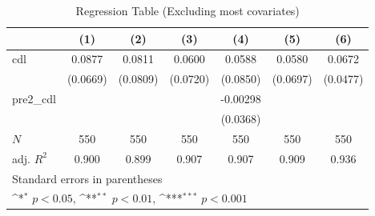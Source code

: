 \begin{table}[htbp]\centering
\def\sym#1{\ifmmode^{#1}\else\(^{#1}\)\fi}
\caption{Regression Table (Excluding most covariates)\label{tab1}}
\begin{tabular}{l*{6}{c}}
\toprule
            &\multicolumn{1}{c}{(1)}         &\multicolumn{1}{c}{(2)}         &\multicolumn{1}{c}{(3)}         &\multicolumn{1}{c}{(4)}         &\multicolumn{1}{c}{(5)}         &\multicolumn{1}{c}{(6)}         \\
\midrule
cdl         &      0.0877         &      0.0811         &      0.0600         &      0.0588         &      0.0580         &      0.0672         \\
            &    (0.0669)         &    (0.0809)         &    (0.0720)         &    (0.0850)         &    (0.0697)         &    (0.0477)         \\
\addlinespace
pre2\_cdl    &                     &                     &                     &    -0.00298         &                     &                     \\
            &                     &                     &                     &    (0.0368)         &                     &                     \\
\midrule
\(N\)       &         550         &         550         &         550         &         550         &         550         &         550         \\
adj. \(R^{2}\)&       0.900         &       0.899         &       0.907         &       0.907         &       0.909         &       0.936         \\
\bottomrule
\multicolumn{7}{l}{\footnotesize Standard errors in parentheses}\\
\multicolumn{7}{l}{\footnotesize \sym{*} \(p<0.05\), \sym{**} \(p<0.01\), \sym{***} \(p<0.001\)}\\
\end{tabular}
\end{table}
